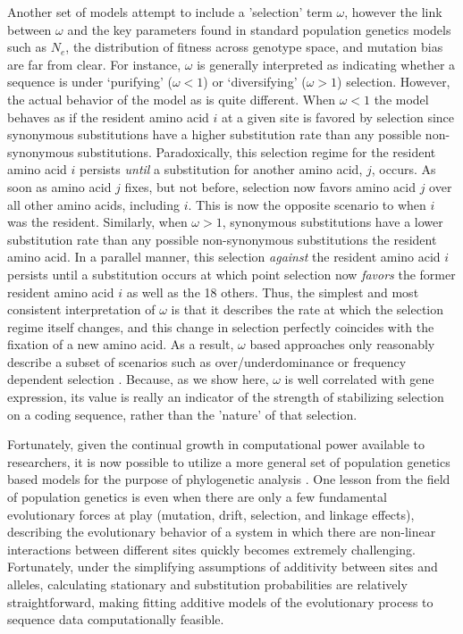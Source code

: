\documentclass{article}
\newcommand{\Ne}{\ensuremath{{N_e}}\xspace} %
\begin{document}
Another set of models attempt to include a 'selection' term $\omega$, however the link between $\omega$ and the key parameters found in standard population genetics models such as \Ne, the distribution of fitness across genotype space, and mutation bias are far from clear.
For instance, $\omega$ is generally interpreted as indicating whether a sequence is under `purifying' ($\omega < 1$) or `diversifying' ($\omega > 1$) selection.
However, the actual behavior of the model as is quite different.
When $\omega < 1$ the model behaves as if the resident amino acid $i$ at a given site is favored by selection since synonymous substitutions have a higher substitution rate than any possible non-synonymous substitutions.
Paradoxically, this selection regime for the resident amino acid $i$ persists \emph{until} a substitution for another amino acid, $j$, occurs.
As soon as amino acid $j$ fixes, but not before, selection now favors amino acid $j$ over all other amino acids, including $i$.
This is now the opposite scenario to when $i$ was the resident.
Similarly, when $\omega > 1$, synonymous substitutions have a lower substitution rate than any possible non-synonymous substitutions the resident amino acid.
In a parallel manner, this selection \emph{against} the resident amino acid $i$ persists until a substitution occurs at which point selection now \emph{favors} the former resident amino acid $i$ as well as the 18 others.
Thus, the simplest and most consistent interpretation of $\omega$ is that it describes the rate at which the selection regime itself changes, and this change in selection perfectly coincides with the fixation of a new amino acid.
As a result, $\omega$ based approaches only reasonably describe a subset of scenarios such as over/underdominance or frequency dependent selection \citep{HughesAndNei1988,Nowak2006}.
Because, as we show here, $\omega$ is well correlated with gene expression, its value is really an indicator of the strength of stabilizing selection on a coding sequence, rather than the 'nature' of that selection.

Fortunately, given the continual growth in computational power available to researchers, it is now possible to utilize a more general set of population genetics based models for the purpose of phylogenetic analysis \citep[e.g.][]{HalpernAndBruno1998,RobinsonEtAl2003,LartillotAndPhilippe2004,RodrigueAndLartillot2014}.
One lesson from the field of population genetics is even when there are only a few fundamental evolutionary forces at play (mutation, drift, selection, and linkage effects), describing the evolutionary behavior of a system in which there are non-linear interactions between different sites quickly becomes extremely challenging.
Fortunately, under the simplifying assumptions of additivity between sites and alleles, calculating stationary and substitution probabilities are relatively straightforward, making fitting additive models of the evolutionary process to sequence data computationally feasible.
\end{document}
